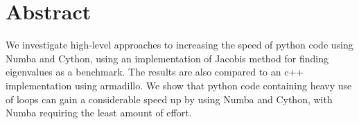 \section{Abstract}
We investigate high-level approaches to increasing the speed of python code
using Numba and Cython, using an implementation of Jacobis method for finding
eigenvalues as a benchmark. The results are also compared to an c++
implementation using armadillo. We show that python code containing heavy use of
loops can gain a considerable speed up by using Numba and Cython, with Numba
requiring the least amount of effort.
